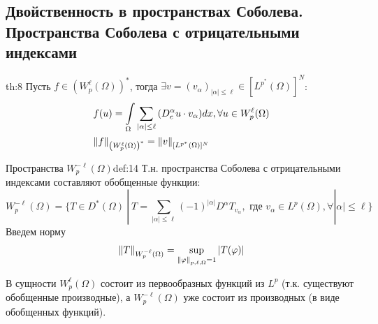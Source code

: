 \documentclass[12pt,a4paper]{article}
\newcommand{\intset}[1]{\int\limits_{#1}}
\begin{document}
\subsection{Двойственность в пространствах Соболева. Пространства Соболева с отрицательными индексами}

\begin{theorem}{}{th:8}
	Пусть $f \in \left(W_p^\ell (\Omega)\right)^*$, тогда $\exists v = (v_\alpha)_{|\alpha| \leq \ell} \in [L^{p^*} (\Omega)]^N$:
	\begin{align*}
		&f(u) = \intset{\Omega}{\sum\limits_{|\alpha| \leq \ell}{(D_c^\alpha u \cdot v_\alpha)} dx}, \forall u \in W_p^\ell (\Omega) \\
		&\norm{f}_{\left(W_p^\ell (\Omega)\right)^*} = \norm{v}_{[L^{p^*} (\Omega)]^N}
	\end{align*}
\end{theorem}

\begin{definition}{Пространства $W_p^{-\ell} (\Omega)$}{def:14}
	Т.н. пространства Соболева с отрицательными индексами составляют обобщенные функции:
	\begin{equation*}
		W_p^{-\ell} (\Omega) = \{ T \in D^* (\Omega) \ | \ T = \sum\limits_{|\alpha| \leq \ell}{(-1)^{|\alpha|} D^\alpha T_{v_\alpha}}, \text { где } v_\alpha \in L^p (\Omega), \forall |\alpha| \leq \ell \}
	\end{equation*}
	Введем норму
	\begin{equation*}
		\norm{T}_{W_p^{-\ell} (\Omega)} = \sup\limits_{\norm{\varphi}_{p, \ell, \Omega} = 1}{|T(\varphi)|}
	\end{equation*}
\end{definition}
В сущности $W_p^\ell (\Omega)$ состоит из первообразных функций из $L^p$ (т.к. существуют обобщенные производные), а $W_p^{-\ell} (\Omega)$ уже состоит из производных (в виде обобщенных функций).
\end{document}
